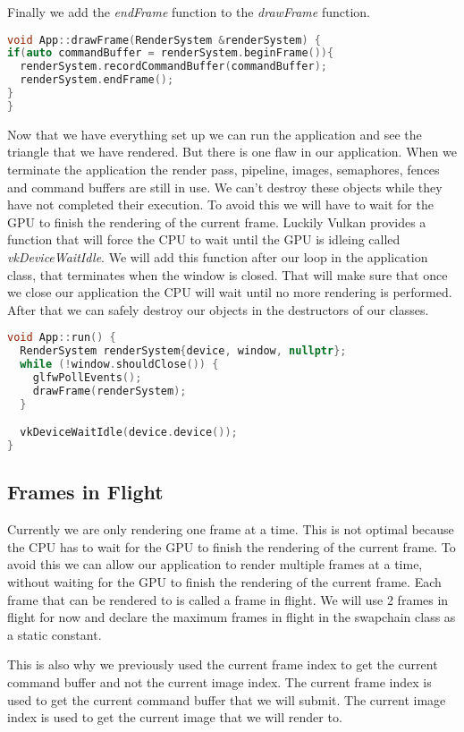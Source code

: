 \documentclass[12pt]{report} \usepackage{preamble}
\begin{document}
Finally we add the \textit{endFrame} function to the \textit{drawFrame} function.

\begin{lstlisting}[language=C++]
void App::drawFrame(RenderSystem &renderSystem) {
if(auto commandBuffer = renderSystem.beginFrame()){
  renderSystem.recordCommandBuffer(commandBuffer); 
  renderSystem.endFrame();
}
}
\end{lstlisting}

Now that we have everything set up we can run the application and see the triangle that we have rendered.
But there is one flaw in our application. When we terminate the application the render pass, pipeline, images, semaphores, fences and command buffers
are still in use. We can't destroy these objects while they have not completed their execution. To avoid this we will have to wait for the
GPU to finish the rendering of the current frame. Luckily Vulkan provides a function that will force the \ac{CPU} to wait until the \ac{GPU}
is idleing called \textit{vkDeviceWaitIdle}. We will add this function after our loop in the application class, that terminates when the window
is closed. That will make sure that once we close our application the \ac{CPU} will wait until no more rendering is performed. After that we can
safely destroy our objects in the destructors of our classes.

\begin{lstlisting}[language=C++]
void App::run() {
  RenderSystem renderSystem{device, window, nullptr};
  while (!window.shouldClose()) {
    glfwPollEvents();
    drawFrame(renderSystem);
  }

  vkDeviceWaitIdle(device.device());
}
\end{lstlisting}

\subsection{Frames in Flight}

Currently we are only rendering one frame at a time. This is not optimal because the CPU has to wait for the GPU to finish the rendering
of the current frame. To avoid this we can allow our application to render multiple frames at a time, without waiting for the GPU to finish
the rendering of the current frame. Each frame that can be rendered to is called a frame in flight. We will use 2 frames in flight for now
and declare the maximum frames in flight in the swapchain class as a static constant.

This is also why we previously used the current frame index to get the current command buffer and not the current image index. The current
frame index is used to get the current command buffer that we will submit. The current image index is used to get the current image that
we will render to.
\end{document}
